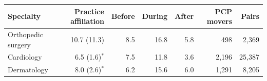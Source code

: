 
\begin{tabular}{lrrrrrr}
\toprule
Specialty & Practice affiliation & Before & During & After & PCP movers & Pairs\\
\midrule
Orthopedic surgery & 10.7 (11.3) & 8.5 & 16.8 & 5.8 & 498 & 2,369\\
Cardiology & 6.5 (1.6)$^{*}$ & 7.5 & 11.8 & 3.6 & 2,196 & 25,387\\
Dermatology & 8.0 (2.6)$^{*}$ & 6.2 & 15.6 & 6.0 & 1,291 & 8,205\\
\bottomrule
\end{tabular}

